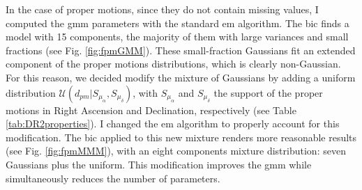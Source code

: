 {In the case of proper motions, since they do not contain missing values, I computed the \gls{gmm} parameters with the standard \gls{em} algorithm. The \gls{bic} finds a model with 15 components, the majority of them with large variances and small fractions (see Fig. \ref{fig:fpmGMM}). These small-fraction Gaussians fit an extended component of the proper motions distributions, which is clearly non-Gaussian. For this reason, we decided modify the mixture of Gaussians by adding a uniform distribution $\mathcal{U}({d}_{pm}|S_{\mu_{\alpha}},S_{\mu_{\delta}})$, with $S_{\mu_{\alpha}}$ and $S_{\mu_{\delta}}$ the support of the proper motions in Right Ascension and Declination, respectively (see Table \ref{tab:DR2properties}). I changed the \gls{em} algorithm to properly account for this modification. The \gls{bic} applied to this new mixture renders more reasonable results (see Fig. \ref{fig:fpmMMM}), with an eight components mixture distribution: seven Gaussians plus the uniform. This modification improves the \gls{gmm} while simultaneously reduces the number of parameters.}


